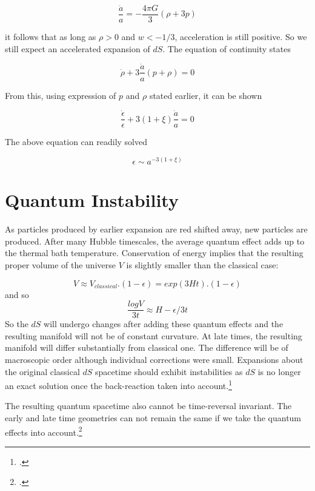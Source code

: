 \begin{equation}
\frac{\ddot{a}}{a}= -\frac{4\pi G}{3}(\rho + 3p)
\end{equation}

it follows that as long as $\rho>0$  and $w<-1/3$, acceleration is still positive. So we still expect an accelerated expansion of $dS$. The equation of continuity states

\begin{equation}
\dot{\rho} + 3\frac{\dot{a}}{a}(p + \rho) = 0
\end{equation}

From this, using expression of $p$ and $\rho$ stated earlier, it can be shown

\begin{equation}
\frac{\dot{\epsilon}}{\epsilon}+3(1+\xi)\frac{\dot{a}}{a}= 0
\end{equation}

The above equation can readily solved

\begin{equation}
\epsilon \sim a^{-3(1+\xi)}
\end{equation}

\section{Quantum Instability}

As particles produced by earlier expansion are red shifted away, new particles are produced. After many Hubble timescales, the average quantum effect adds up to the thermal bath temperature. Conservation of energy implies that the resulting proper volume of the universe $V$ is slightly smaller than the classical case:

\begin{equation}
V\approx V_{classical} . (1-\epsilon) = exp(3Ht). (1-\epsilon)
\end{equation}
and so
\begin{equation}
\frac{logV}{3t}\approx H - \epsilon/3t
\end{equation}
So the $dS$ will undergo changes after adding these quantum effects and the resulting manifold will not be of constant curvature. At late times, the resulting manifold will differ substantially from classical one. The difference will be of macroscopic order although individual corrections were small. Expansions about the original classical $dS$ spacetime should exhibit instabilities as $dS$ is no longer an exact solution once the back-reaction taken into account.\footcite[It has to be noted stability of $dS$ can be put to question from a point of view different from the one considered Here. For example see][] {ford:1985} \par

The resulting quantum spacetime also cannot be time-reversal invariant. The early and late time geometries can not remain the same if we take the quantum effects into account.\footcite[It has been discussed in detail in   ][] {anderson:2014}